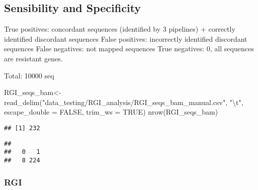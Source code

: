 \documentclass[
]{article}
\newenvironment{Shaded}{\begin{snugshade}}{\end{snugshade}}
\newcommand{\AttributeTok}[1]{\textcolor[rgb]{0.77,0.63,0.00}{#1}}
\newcommand{\ConstantTok}[1]{\textcolor[rgb]{0.00,0.00,0.00}{#1}}
\newcommand{\FunctionTok}[1]{\textcolor[rgb]{0.00,0.00,0.00}{#1}}
\newcommand{\NormalTok}[1]{#1}
\newcommand{\OtherTok}[1]{\textcolor[rgb]{0.56,0.35,0.01}{#1}}
\newcommand{\SpecialCharTok}[1]{\textcolor[rgb]{0.00,0.00,0.00}{#1}}
\newcommand{\StringTok}[1]{\textcolor[rgb]{0.31,0.60,0.02}{#1}}
\begin{document}
\hypertarget{sensibility-and-specificity}{%
\subsection{Sensibility and
Specificity}\label{sensibility-and-specificity}}

True positives: concordant sequences (identified by 3 pipelines) +
correctly identified discordant sequences False positives: incorrectly
identified discordant sequences False negatives: not mapped sequences
True negatives: 0, all sequences are resistant genes.

Total: 10000 seq

\begin{Shaded}
\begin{Highlighting}[]
\NormalTok{RGI\_seqs\_bam}\OtherTok{\textless{}{-}} \FunctionTok{read\_delim}\NormalTok{(}\StringTok{"data\_testing/RGI\_analysis/RGI\_seqs\_bam\_manual.csv"}\NormalTok{, }
    \StringTok{"}\SpecialCharTok{\textbackslash{}t}\StringTok{"}\NormalTok{, }\AttributeTok{escape\_double =} \ConstantTok{FALSE}\NormalTok{, }\AttributeTok{trim\_ws =} \ConstantTok{TRUE}\NormalTok{)}
\FunctionTok{nrow}\NormalTok{(RGI\_seqs\_bam)}
\end{Highlighting}
\end{Shaded}

\begin{verbatim}
## [1] 232
\end{verbatim}

\begin{Shaded}
\end{Shaded}

\begin{verbatim}
## 
##   0   1 
##   8 224
\end{verbatim}

\hypertarget{rgi-1}{%
\subsubsection{RGI}\label{rgi-1}}
\end{document}
